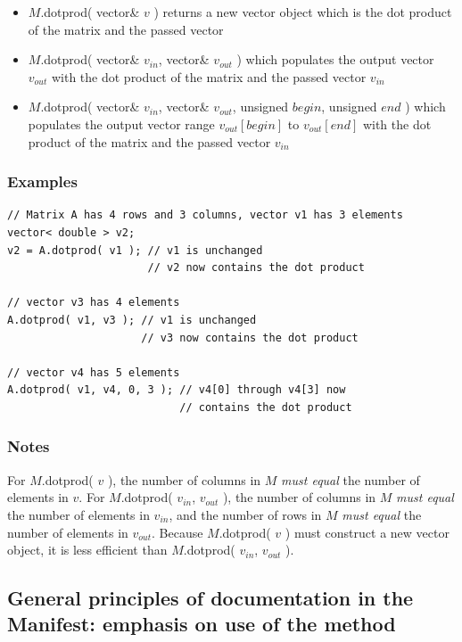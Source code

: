 \documentclass{report}
\begin{document}
\begin{itemize}
\item $M$.dotprod( vector\& $v$ ) returns a new vector object which is
      the dot product of the matrix and the passed vector
\item $M$.dotprod( vector\& $v_{in}$, vector\& $v_{out}$ ) which
      populates the output vector $v_{out}$ with the dot product of
      the matrix and the passed vector $v_{in}$
\item $M$.dotprod( vector\& $v_{in}$, vector\& $v_{out}$, unsigned
      $begin$, unsigned $end$ ) which populates the output vector
      range
      $v_{out}[begin]$ to $v_{out}[end]$ with the dot product of the
      matrix and the passed vector $v_{in}$
\end{itemize}

\subsubsection{Examples}

\begin{verbatim}
// Matrix A has 4 rows and 3 columns, vector v1 has 3 elements
vector< double > v2;
v2 = A.dotprod( v1 ); // v1 is unchanged
                      // v2 now contains the dot product

// vector v3 has 4 elements
A.dotprod( v1, v3 ); // v1 is unchanged
                     // v3 now contains the dot product

// vector v4 has 5 elements
A.dotprod( v1, v4, 0, 3 ); // v4[0] through v4[3] now
                           // contains the dot product
\end{verbatim}

\subsubsection{Notes}
For $M$.dotprod( $v$ ), the number of columns in $M$ {\em must equal}
the number of elements in $v$.  For $M$.dotprod( $v_{in}$, $v_{out}$
), the number of columns in $M$ {\em must equal} the number of
elements in $v_{in}$, and the number of rows in $M$ {\em must equal}
the number of elements in $v_{out}$.  Because $M$.dotprod( $v$ ) must
construct a new vector object, it is less efficient than $M$.dotprod(
$v_{in}$, $v_{out}$ ).

\subsection{General principles of documentation in the Manifest:
emphasis on use of the method}
\end{document}
